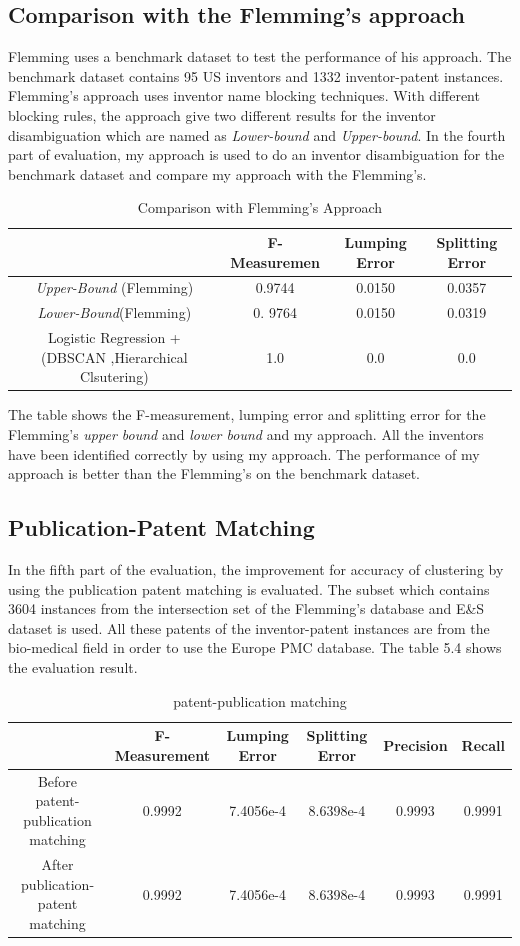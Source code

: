 \subsection{Comparison with the Flemming's approach}
Flemming uses a benchmark dataset to test the performance of his approach. The benchmark dataset contains 95 US inventors and 1332 inventor-patent instances.  Flemming's approach uses inventor name blocking techniques.  With different blocking rules, the approach give two different results for the inventor disambiguation which are named as \emph{Lower-bound} and \emph{Upper-bound}. In the fourth part of evaluation, my approach is used to do an inventor disambiguation for the benchmark dataset and compare my approach with the Flemming's. 
\begin{table}
\scriptsize
\begin{tabular}{|c|c|c|c|}
\hline
&F-Measuremen&Lumping Error&Splitting Error\\
\hline

\emph{Upper-Bound} (Flemming)&0.9744 &0.0150&0.0357\\

\hline

\emph{Lower-Bound}(Flemming)&0. 9764& 0.0150& 0.0319\\
\hline
Logistic Regression + (DBSCAN ,Hierarchical Clsutering) & 1.0 &0.0&0.0\\
\hline
\end{tabular}
\caption{Comparison with Flemming's Approach}
\end{table}
The table shows the F-measurement, lumping error and splitting error for the Flemming's \emph{upper bound} and \emph{lower bound} and my approach. All the inventors have been identified correctly by using my approach. The performance of my approach is better than the Flemming's on the benchmark dataset. 

\subsection{Publication-Patent Matching}
In the fifth part of the evaluation, the improvement for accuracy of clustering by using the publication patent matching is evaluated. The subset which contains 3604 instances from the intersection set of the Flemming's database and E\&S dataset is used. All these patents of the inventor-patent instances are from the bio-medical field in order to use the Europe PMC database.  The table 5.4 shows the evaluation result.
\begin{table} 
\scriptsize
\begin{tabular}{|c|c|c|c|c|c|}
\hline
&F-Measurement&Lumping Error&Splitting Error&Precision&Recall\\
\hline
Before patent-publication matching&0.9992&7.4056e-4&8.6398e-4&0.9993 &0.9991\\
\hline
After publication-patent matching&0.9992&7.4056e-4&8.6398e-4&0.9993 &0.9991 \\
\hline
\end{tabular}
\caption{patent-publication matching}
\end{table}

